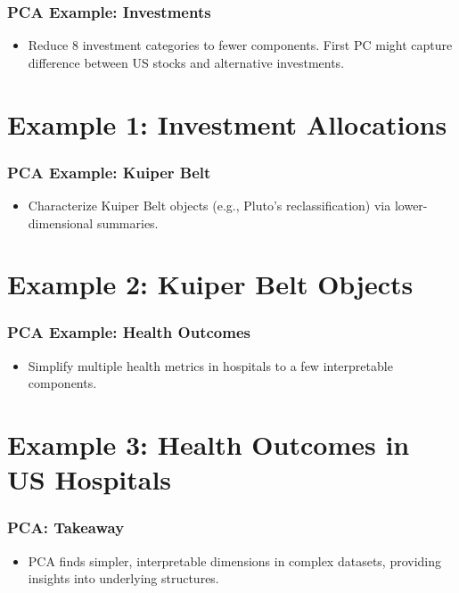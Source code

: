 \documentclass{beamer}
\begin{document}
\begin{frame}
    \frametitle{PCA Example: Investments}
    \begin{itemize}
        \item Reduce 8 investment categories to fewer components. First PC might capture difference between US stocks and alternative investments.
    \end{itemize}
\end{frame}

\section{Example 1: Investment Allocations}

\begin{frame}
    \frametitle{PCA Example: Kuiper Belt}
    \begin{itemize}
        \item Characterize Kuiper Belt objects (e.g., Pluto's reclassification) via lower-dimensional summaries.
    \end{itemize}
\end{frame}

\section{Example 2: Kuiper Belt Objects}

\begin{frame}
    \frametitle{PCA Example: Health Outcomes}
    \begin{itemize}
        \item Simplify multiple health metrics in hospitals to a few interpretable components.
    \end{itemize}
\end{frame}

\section{Example 3: Health Outcomes in US Hospitals}

\begin{frame}
    \frametitle{PCA: Takeaway}
    \begin{itemize}
        \item PCA finds simpler, interpretable dimensions in complex datasets, providing insights into underlying structures.
    \end{itemize}
\end{frame}
\end{document}
